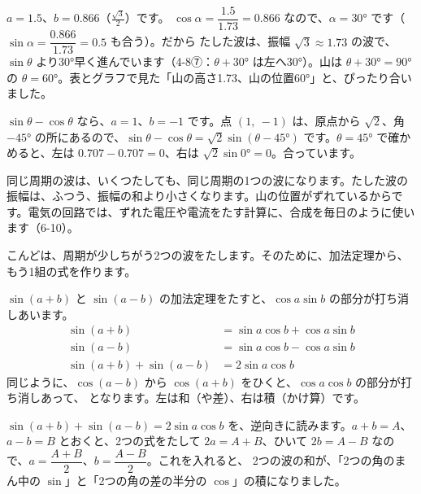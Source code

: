 $a=1.5$、$b=0.866$（$\frac{\sqrt3}{2}$）です。
$\cos\alpha=\dfrac{1.5}{1.73}=0.866$ なので、$\alpha=30°$ です（$\sin\alpha=\dfrac{0.866}{1.73}=0.5$ も合う）。だから
たした波は、振幅 $\sqrt3\approx1.73$ の波で、$\sin\theta$ より30°早く進んでいます（4-8⑦：$\theta+30°$ は左へ30°）。山は $\theta+30°=90°$ の $\theta=60°$。表とグラフで見た「山の高さ1.73、山の位置60°」と、ぴったり合いました。

$\sin\theta-\cos\theta$ なら、$a=1$、$b=-1$ です。点 $(1,\ -1)$ は、原点から $\sqrt2$、角 $-45°$ の所にあるので、$\sin\theta-\cos\theta=\sqrt2\sin(\theta-45°)$ です。$\theta=45°$ で確かめると、左は $0.707-0.707=0$、右は $\sqrt2\sin0°=0$。合っています。

同じ周期の波は、いくつたしても、同じ周期の1つの波になります。たした波の振幅は、ふつう、振幅の和より小さくなります。山の位置がずれているからです。電気の回路では、ずれた電圧や電流をたす計算に、合成を毎日のように使います（6-10）。


\leavevmode\label{bk:4-9:unari}こんどは、周期が少しちがう2つの波をたします。そのために、加法定理から、もう1組の式を作ります。

$\sin(a+b)$ と $\sin(a-b)$ の加法定理をたすと、$\cos a\sin b$ の部分が打ち消しあいます。
\begin{align*}
\sin(a+b)&=\sin a\cos b+\cos a\sin b\\
\sin(a-b)&=\sin a\cos b-\cos a\sin b\\
\sin(a+b)+\sin(a-b)&=2\sin a\cos b
\end{align*}
同じように、$\cos(a-b)$ から $\cos(a+b)$ をひくと、$\cos a\cos b$ の部分が打ち消しあって、
となります。左は和（や差）、右は積（かけ算）です。

$\sin(a+b)+\sin(a-b)=2\sin a\cos b$ を、逆向きに読みます。$a+b=A$、$a-b=B$ とおくと、2つの式をたして $2a=A+B$、ひいて $2b=A-B$ なので、$a=\dfrac{A+B}{2}$、$b=\dfrac{A-B}{2}$。これを入れると、
2つの波の和が、「2つの角のまん中の $\sin$」と「2つの角の差の半分の $\cos$」の積になりました。

